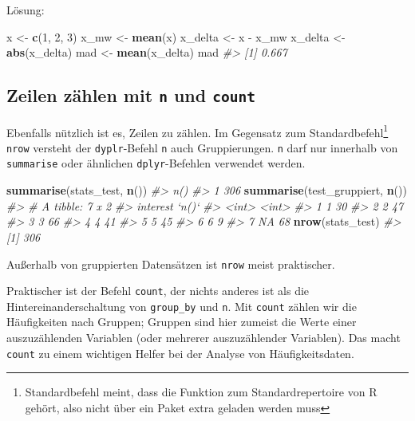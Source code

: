 \documentclass[12pt,ngerman,]{book}
\makeatletter
\newenvironment{Shaded}{\begin{snugshade}}{\end{snugshade}}
\newcommand{\KeywordTok}[1]{\textcolor[rgb]{0.13,0.29,0.53}{\textbf{{#1}}}}
\newcommand{\DecValTok}[1]{\textcolor[rgb]{0.00,0.00,0.81}{{#1}}}
\newcommand{\StringTok}[1]{\textcolor[rgb]{0.31,0.60,0.02}{{#1}}}
\newcommand{\CommentTok}[1]{\textcolor[rgb]{0.56,0.35,0.01}{\textit{{#1}}}}
\newcommand{\NormalTok}[1]{{#1}}
\let\rmarkdownfootnote\footnote%
\def\footnote{\protect\rmarkdownfootnote}
\newenvironment{kframe}{%
\medskip{}
\setlength{\fboxsep}{.8em}
 \def\at@end@of@kframe{}%
 \ifinner\ifhmode%
  \def\at@end@of@kframe{\end{minipage}}%
  \begin{minipage}{\columnwidth}%
 \fi\fi%
 \def\FrameCommand##1{\hskip\@totalleftmargin \hskip-\fboxsep
 \colorbox{shadecolor}{##1}\hskip-\fboxsep
     \hskip-\linewidth \hskip-\@totalleftmargin \hskip\columnwidth}%
 \MakeFramed {\advance\hsize-\width
   \@totalleftmargin\z@ \linewidth\hsize
   \@setminipage}}%
 {\par\unskip\endMakeFramed%
 \at@end@of@kframe}
\renewenvironment{Shaded}{\begin{kframe}}{\end{kframe}}
\makeatother
\begin{document}
Lösung:

\begin{Shaded}
\begin{Highlighting}[]
\NormalTok{x <-}\StringTok{ }\KeywordTok{c}\NormalTok{(}\DecValTok{1}\NormalTok{, }\DecValTok{2}\NormalTok{, }\DecValTok{3}\NormalTok{)}
\NormalTok{x_mw <-}\StringTok{ }\KeywordTok{mean}\NormalTok{(x)}
\NormalTok{x_delta <-}\StringTok{ }\NormalTok{x -}\StringTok{ }\NormalTok{x_mw}
\NormalTok{x_delta <-}\StringTok{ }\KeywordTok{abs}\NormalTok{(x_delta)}
\NormalTok{mad <-}\StringTok{ }\KeywordTok{mean}\NormalTok{(x_delta)}
\NormalTok{mad}
\CommentTok{#> [1] 0.667}
\end{Highlighting}
\end{Shaded}

\subsection{\texorpdfstring{Zeilen zählen mit \texttt{n} und
\texttt{count}}{Zeilen zählen mit n und count}}\label{zeilen-zahlen-mit-n-und-count}

Ebenfalls nützlich ist es, Zeilen zu zählen. Im Gegensatz zum
Standardbefehl\footnote{Standardbefehl meint, dass die Funktion zum
  Standardrepertoire von R gehört, also nicht über ein Paket extra
  geladen werden muss} \texttt{nrow} versteht der \texttt{dyplr}-Befehl
\texttt{n} auch Gruppierungen. \texttt{n} darf nur
innerhalb von \texttt{summarise} oder ähnlichen \texttt{dplyr}-Befehlen
verwendet werden.

\begin{Shaded}
\begin{Highlighting}[]
\KeywordTok{summarise}\NormalTok{(stats_test, }\KeywordTok{n}\NormalTok{())}
\CommentTok{#>   n()}
\CommentTok{#> 1 306}
\KeywordTok{summarise}\NormalTok{(test_gruppiert, }\KeywordTok{n}\NormalTok{())}
\CommentTok{#> # A tibble: 7 x 2}
\CommentTok{#>   interest `n()`}
\CommentTok{#>      <int> <int>}
\CommentTok{#> 1        1    30}
\CommentTok{#> 2        2    47}
\CommentTok{#> 3        3    66}
\CommentTok{#> 4        4    41}
\CommentTok{#> 5        5    45}
\CommentTok{#> 6        6     9}
\CommentTok{#> 7       NA    68}
\KeywordTok{nrow}\NormalTok{(stats_test)}
\CommentTok{#> [1] 306}
\end{Highlighting}
\end{Shaded}

Außerhalb von gruppierten Datensätzen ist \texttt{nrow} meist
praktischer.

Praktischer ist der Befehl \texttt{count}, der
nichts anderes ist als die Hintereinanderschaltung von
\texttt{group\_by} und \texttt{n}. Mit \texttt{count} zählen wir die
Häufigkeiten nach Gruppen; Gruppen sind hier zumeist die Werte einer
auszuzählenden Variablen (oder mehrerer auszuzählender Variablen). Das
macht \texttt{count} zu einem wichtigen Helfer bei der Analyse von
Häufigkeitsdaten.
\end{document}
